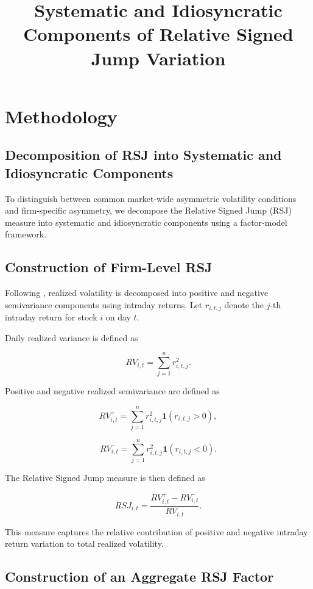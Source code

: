 \documentclass[11pt]{article}
\title{Systematic and Idiosyncratic Components of Relative Signed Jump Variation}
\author{}
\date{}
\begin{document}
\maketitle

\section{Methodology}

\subsection{Decomposition of RSJ into Systematic and Idiosyncratic Components}

To distinguish between common market-wide asymmetric volatility
conditions and firm-specific asymmetry, we decompose the Relative
Signed Jump (RSJ) measure into systematic and idiosyncratic components
using a factor-model framework.

\subsection{Construction of Firm-Level RSJ}

Following \citet{bollerslev2019}, realized volatility is decomposed into
positive and negative semivariance components using intraday returns.
Let $r_{i,t,j}$ denote the $j$-th intraday return for stock $i$ on day $t$.

Daily realized variance is defined as

\[
RV_{i,t} = \sum_{j=1}^{n} r_{i,t,j}^{2}.
\]

Positive and negative realized semivariance are defined as

\[
RV^+_{i,t} =
\sum_{j=1}^{n}
r_{i,t,j}^{2} \mathbf{1}(r_{i,t,j} > 0),
\]

\[
RV^-_{i,t} =
\sum_{j=1}^{n}
r_{i,t,j}^{2} \mathbf{1}(r_{i,t,j} < 0).
\]

The Relative Signed Jump measure is then defined as

\[
RSJ_{i,t} =
\frac{RV^+_{i,t} - RV^-_{i,t}}{RV_{i,t}}.
\]

This measure captures the relative contribution of positive and
negative intraday return variation to total realized volatility.

\subsection{Construction of an Aggregate RSJ Factor}
\end{document}
